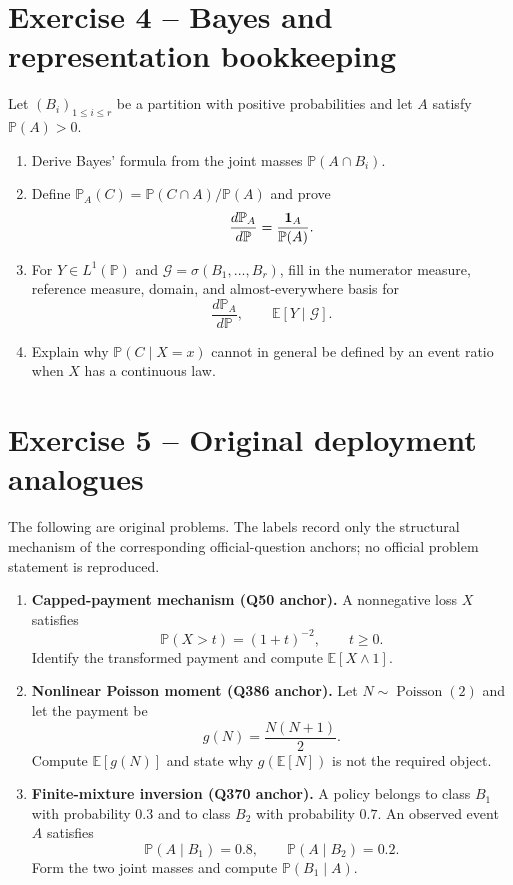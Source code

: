 \section*{Exercise 4 -- Bayes and representation bookkeeping}

Let $(B_i)_{1\le i\le r}$ be a partition with positive probabilities and let $A$ satisfy $\mathbb P(A)>0$.
\begin{enumerate}
  \item Derive Bayes' formula from the joint masses $\mathbb P(A\cap B_i)$.
  \item Define $\mathbb P_A(C)=\mathbb P(C\cap A)/\mathbb P(A)$ and prove
  \[
  \frac{d\mathbb P_A}{d\mathbb P}
  =
  \frac{\mathbf 1_A}{\mathbb P(A)}.
  \]
  \item For $Y\in L^1(\mathbb P)$ and $\mathcal G=\sigma(B_1,\ldots,B_r)$, fill in the numerator measure, reference measure, domain, and almost-everywhere basis for
  \[
  \frac{d\mathbb P_A}{d\mathbb P},
  \qquad
  \mathbb E[Y\mid\mathcal G].
  \]
  \item Explain why $\mathbb P(C\mid X=x)$ cannot in general be defined by an event ratio when $X$ has a continuous law.
\end{enumerate}

\section*{Exercise 5 -- Original deployment analogues}

The following are original problems. The labels record only the structural mechanism of the corresponding official-question anchors; no official problem statement is reproduced.
\begin{enumerate}
  \item \textbf{Capped-payment mechanism (Q50 anchor).}
  A nonnegative loss $X$ satisfies
  \[
  \mathbb P(X>t)=(1+t)^{-2},
  \qquad t\ge0.
  \]
  Identify the transformed payment and compute $\mathbb E[X\wedge1]$.
  \item \textbf{Nonlinear Poisson moment (Q386 anchor).}
  Let $N\sim\operatorname{Poisson}(2)$ and let the payment be
  \[
  g(N)=\frac{N(N+1)}2.
  \]
  Compute $\mathbb E[g(N)]$ and state why $g(\mathbb E[N])$ is not the required object.
  \item \textbf{Finite-mixture inversion (Q370 anchor).}
  A policy belongs to class $B_1$ with probability $0.3$ and to class $B_2$ with probability $0.7$. An observed event $A$ satisfies
  \[
  \mathbb P(A\mid B_1)=0.8,
  \qquad
  \mathbb P(A\mid B_2)=0.2.
  \]
  Form the two joint masses and compute $\mathbb P(B_1\mid A)$.
\end{enumerate}

